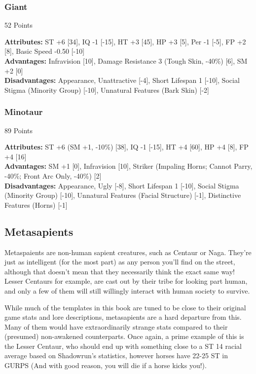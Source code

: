 \begin{multicols*}{3}
	\subsubsection*{Giant}
	\begin{flushright}
		52 Points
	\end{flushright}
	\textbf{Attributes:} 
	ST +6 [34], IQ -1 [-15], HT +3 [45], HP +3 [5], Per -1 [-5], FP +2 [8], Basic Speed -0.50 [-10]
	\\\textbf{Advantages:} 
	Infravision [10], Damage Resistance 3 (Tough Skin, -40\%) [6], SM +2 [0]
	\\\textbf{Disadvantages:} 
	Appearance, Unattractive [-4], Short Lifespan 1 [-10], Social Stigma (Minority Group) [-10], Unnatural Features (Bark Skin) [-2]
	
	\subsubsection*{Minotaur}
	\begin{flushright}
		89 Points
	\end{flushright}
	\textbf{Attributes:} 
	ST +6 (SM +1, -10\%) [38], IQ -1 [-15], HT +4 [60], HP +4 [8], FP +4 [16]
	\\\textbf{Advantages:} 
	SM +1 [0], Infravision [10], Striker (Impaling Horns; Cannot Parry, -40\%; Front Arc Only, -40\%) [2]
	\\\textbf{Disadvantages:} 
	Appearance, Ugly [-8], Short Lifespan 1 [-10], Social Stigma (Minority Group) [-10], Unnatural Features (Facial Structure) [-1], Distinctive Features (Horns) [-1]
	
	\subsection{Metasapients}
	
	Metaspaients are non-human sapient creatures, such as Centaur or Naga. They're just as intelligent (for the most part) as any person you'll find on the street, although that doesn't mean that they necessarily think the exact same way! Lesser Centaurs for example, are cast out by their tribe for looking part human, and only a few of them will still willingly interact with human society to survive.
	
	While much of the templates in this book are tuned to be close to their original game stats and lore descriptions, metasapients are a hard departure from this. Many of them would have extraordinarily strange stats compared to their (presumed) non-awakened counterparts. Once again, a prime example of this is the Lesser Centaur, who should end up with something close to a ST 14 racial average based on Shadowrun's statistics, however horses have 22-25 ST in GURPS (And with good reason, you will die if a horse kicks you!). 
	

\end{multicols*}
